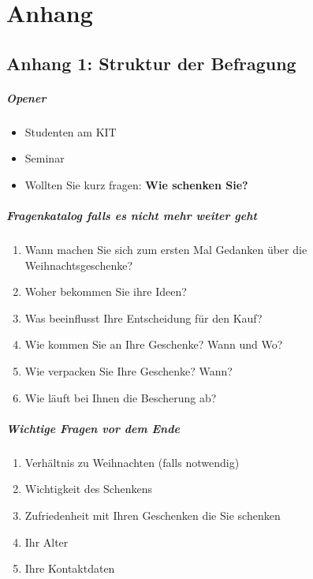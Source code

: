 \chapter{Anhang}
\label{chap:appendix}

\section{Anhang 1: Struktur der Befragung}
\label{anhang:fragebogen}
\paragraph{Opener}
\begin{itemize}
    \item Studenten am KIT
    \item Seminar
    \item Wollten Sie kurz fragen: \textbf{Wie schenken Sie?}
\end{itemize}

\paragraph{Fragenkatalog falls es nicht mehr weiter geht}
\begin{enumerate}
    \item Wann machen Sie sich zum ersten Mal Gedanken über die Weihnachtsgeschenke?
    \item Woher bekommen Sie ihre Ideen?
    \item Was beeinflusst Ihre Entscheidung für den Kauf?
    \item Wie kommen Sie an Ihre Geschenke?  Wann und Wo?
    \item Wie verpacken Sie Ihre Geschenke?  Wann?
    \item Wie läuft bei Ihnen die Bescherung ab?
\end{enumerate}

\paragraph{Wichtige Fragen vor dem Ende}
\begin{enumerate}
    \item Verhältnis zu Weihnachten (falls notwendig)
    \item Wichtigkeit des Schenkens
    \item Zufriedenheit mit Ihren Geschenken die Sie schenken
    \item Ihr Alter
    \item Ihre Kontaktdaten
\end{enumerate}

